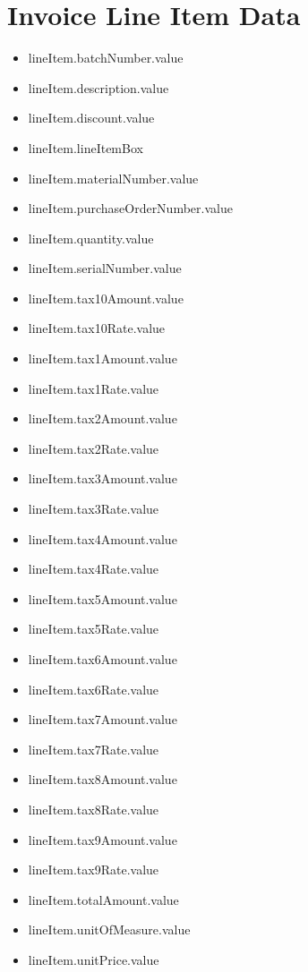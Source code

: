 \section{Invoice Line Item Data}
\begin{multicols}{2}
	\label{invoice-lines}
	\begin{itemize}
		\setlength\multicolsep{0pt}
		\item[] lineItem.batchNumber.value
		\item[] lineItem.description.value
		\item[] lineItem.discount.value
		\item[] lineItem.lineItemBox
		\item[] lineItem.materialNumber.value
		\item[] lineItem.purchaseOrderNumber.value
		\item[] lineItem.quantity.value
		\item[] lineItem.serialNumber.value
		\item[] lineItem.tax10Amount.value
		\item[] lineItem.tax10Rate.value
		\item[] lineItem.tax1Amount.value
		\item[] lineItem.tax1Rate.value
		\item[] lineItem.tax2Amount.value
		\item[] lineItem.tax2Rate.value
		\item[] lineItem.tax3Amount.value
		\item[] lineItem.tax3Rate.value
		\item[] lineItem.tax4Amount.value
		\item[] lineItem.tax4Rate.value
		\item[] lineItem.tax5Amount.value
		\item[] lineItem.tax5Rate.value
		\item[] lineItem.tax6Amount.value
		\item[] lineItem.tax6Rate.value
		\item[] lineItem.tax7Amount.value
		\item[] lineItem.tax7Rate.value
		\item[] lineItem.tax8Amount.value
		\item[] lineItem.tax8Rate.value
		\item[] lineItem.tax9Amount.value
		\item[] lineItem.tax9Rate.value
		\item[] lineItem.totalAmount.value
		\item[] lineItem.unitOfMeasure.value
		\item[] lineItem.unitPrice.value
	\end{itemize}
\end{multicols}
\newpage
